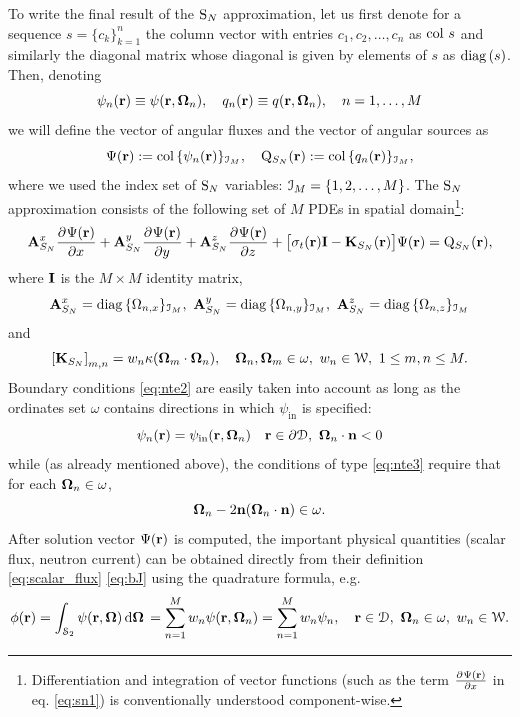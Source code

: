 To write  the final result of the $\text{S}_{N}$ approximation, let us first denote for a sequence $s = \{c_k\}_{k=1}^n$ the
column vector with entries $c_1,c_2,\ldots,c_n$ as $\operatorname{col\,} s$ and similarly the diagonal matrix whose diagonal is
given by elements of $s$ as $\operatorname{diag\,}(s)$. Then, denoting
\begin{equation}\label{eq:sn_vecs}
\psi_n(\mathbf{r}) \equiv \psi(\mathbf{r},\mathbf{\Omega}_n), \quad q_n(\mathbf{r}) \equiv
q(\mathbf{r},\mathbf{\Omega}_n),\quad n = 1,\ldots, M	
\end{equation}
we will define the vector of angular fluxes and the vector of angular sources as
\begin{equation}\label{eq:sn_vars}
\Psi(\mathbf{r}) := \operatorname{col\,}\{\psi_n(\mathbf{r})\}_{\mathcal{I}_{M}},\quad
\mathrm{Q}_{S_N}(\mathbf{r}) := \operatorname{col\,}\{q_n(\mathbf{r})\}_{\mathcal{I}_{M}},
\end{equation}
where we used the index set of $\text{S}_{N}$ variables: $\mathcal{I}_{M} = \{1,2,\ldots,M\}$. The $\text{S}_{N}$ approximation consists of the
following set of $M$ PDEs in spatial domain\footnote{Differentiation and integration of vector functions (such as the 
term $\frac{\partial^{}\Psi(\mathbf{r})}{\partial x^{}}$ in eq. \eqref{eq:sn1}) is conventionally understood component-wise.}:
\begin{equation}\label{eq:sn1} 
\mathbf{A}_{S_N}^x\frac{\partial^{}\Psi(\mathbf{r})}{\partial x^{}} + \mathbf{A}_{S_N}^y\frac{\partial^{}\Psi(\mathbf{r})}{\partial y^{}} +
\mathbf{A}_{S_N}^z\frac{\partial^{}\Psi(\mathbf{r})}{\partial z^{}} + \bigl[\sigma_t(\mathbf{r})\mathbf{I} - \mathbf{K}_{S_N}(\mathbf{r})\bigr]\Psi(\mathbf{r}) = \mathrm{Q}_{S_N}(\mathbf{r}),
\end{equation}
where $\mathbf{I}$ is the $M\times M$ identity matrix,
$$
	\mathbf{A}_{S_N}^x = \operatorname{diag\,}\{\Omega_{n,x}\}_{\mathcal{I}_{M}},\ \mathbf{A}_{S_N}^y = \operatorname{diag\,}\{\Omega_{n,y}\}_{\mathcal{I}_{M}},\
	\mathbf{A}_{S_N}^z = \operatorname{diag\,}\{\Omega_{n,z}\}_{\mathcal{I}_{M}}
$$
and
\begin{equation}\label{eq:SNK}
	\left[\mathbf{K}_{S_N}\right]_{m,n} = w_n \kappa(\mathbf{\Omega}_m\cdot\mathbf{\Omega}_n),\quad
	\mathbf{\Omega}_n,\mathbf{\Omega}_m\in \omega,\ w_n\in \mathcal{W},\ 1 \leq m,n \leq M.
\end{equation}
Boundary conditions \eqref{eq:nte2} are easily taken into account as long as the ordinates set $\omega$ contains
directions in which $\psi_{\text{in}}$ is specified:
\begin{equation}\label{eq:bc_sn}
	\psi_n(\br) = \psi_{\text{in}}(\br, \bomega_n)\quad \br\in\pV, \ \bomega_n\cdot\bn < 0
\end{equation}	
while (as already mentioned above), the conditions of type
\eqref{eq:nte3} require that for each $\mathbf{\Omega}_n\in\omega$, 
$$
	\mathbf{\Omega}_n - 2 \mathbf{n} (\mathbf{\Omega}_n \cdot \mathbf{n}) \in \omega.
$$ 
After solution vector $\Psi(\mathbf{r})$ is computed, the
important physical quantities (scalar flux, neutron current) can be obtained directly from their definition \eqref{eq:scalar_flux}
\eqref{eq:bJ} using the quadrature formula, e.g.
$$
	\phi(\mathbf{r}) = \int_{\mathcal{S}_2}\psi(\mathbf{r},\mathbf{\Omega})\,\text{d}\mathbf{\Omega}\, = \sum_{n=1}^{M} w_n \psi(\mathbf{r},\mathbf{\Omega}_n) = \sum_{n=1}^{M} w_n \psi_n, \quad \mathbf{r}\in
	\mathcal{D},\ \mathbf{\Omega}_n\in \omega,\ w_n\in \mathcal{W}.
$$

